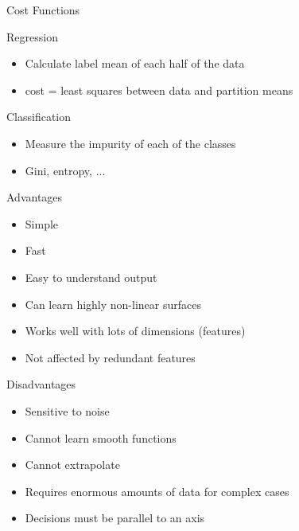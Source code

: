 \documentclass{beamer}
\begin{document}
\begin{frame}{Cost Functions}

  Regression
  \begin{itemize}
    \item Calculate label mean of each half of the data
    \item cost = least squares between data and partition means
  \end{itemize}

  Classification
  \begin{itemize}
    \item Measure the impurity of each of the classes
    \item Gini, entropy, ...
  \end{itemize}

\end{frame}

\begin{frame}{Advantages}
  \begin{itemize}
  \item Simple
  \item Fast
  \item Easy to understand output
  \item Can learn highly non-linear surfaces
  \item Works well with lots of dimensions (features)
  \item Not affected by redundant features
  \end{itemize}
\end{frame}

\begin{frame}{Disadvantages}
  \begin{itemize}
  \item Sensitive to noise
  \item Cannot learn smooth functions
  \item Cannot extrapolate
  \item Requires enormous amounts of data for complex cases
  \item Decisions must be parallel to an axis
  \end{itemize}
\end{frame}

\end{document}
